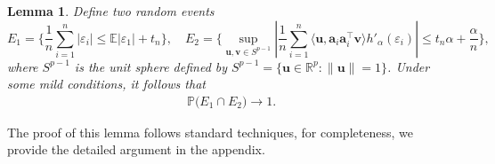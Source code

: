 \documentclass{article}
\newtheorem{lemma}[theorem]{Lemma}
\numberwithin{equation}{section}
\begin{document}
\begin{lemma}\label{prob-E} Define two random events $$E_1=\big\{\frac{1}{n}\sum_{i=1}^n|\varepsilon_i|\leq\mathbb{E}|\varepsilon_1|+t_n\big\},\quad E_2=\{\sup_{\mathbf{u},\mathbf{v}\in S^{p-1}}|\frac{1}{n}\sum_{i=1}^n\langle \mathbf{u}, \mathbf{a}_i\mathbf{a}_i^\top\mathbf{v}\rangle h'_{\alpha}(\varepsilon_i)|\leq t_n\alpha+\frac{\alpha}{n}\},$$
	where $S^{p-1}$ is the unit sphere defined by $S^{p-1}=\{\mathbf{u}\in\mathbb{R}^p: \|\mathbf{u}\|=1\}$. Under some mild conditions, it follows that
	\begin{equation}\label{prob-E1E2}
		\begin{aligned}\mathbb{P}\big( E_1\cap E_2\big)\to 1.\nonumber	\end{aligned}
	\end{equation}		
\end{lemma}
The proof of this lemma follows standard techniques, for completeness, we provide the detailed argument in the appendix.
\end{document}
